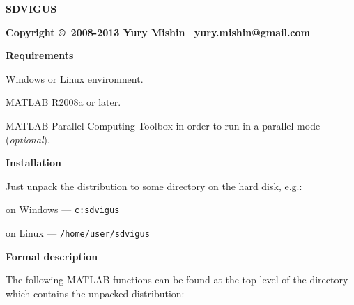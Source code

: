 \documentclass[a4paper,onesided,12pt]{letter}
\begin{document}
\begin{center}
{\LARGE\bfseries\sffamily
SDVIGUS }

{\bfseries\sffamily
Copyright \copyright\ 2008-2013 Yury Mishin \textbar\ yury.mishin@gmail.com}
\end{center}

\makebox[\textwidth]{
\rule{1.05\linewidth}{0.35mm}}

\begin{list}{}{\leftmargin=1em}

\item \textbf{Requirements}

\begin{list}{}{\leftmargin=1em}

\item Windows or Linux environment.

\item MATLAB R2008a or later.

\item MATLAB Parallel Computing Toolbox in order to run in a parallel mode (\textsl{optional}).


\end{list}

\item \textbf{Installation}

Just unpack the distribution to some directory on the hard disk, e.g.:

on Windows --- \texttt{c:sdvigus}

on Linux --- \texttt{/home/user/sdvigus}

\item \textbf{Formal description}

The following MATLAB functions can be found at the top level of the directory which contains the unpacked distribution:


\end{list}
\end{document}
